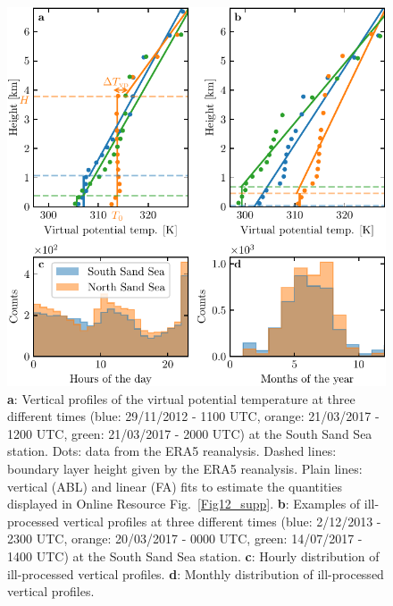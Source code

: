 \begin{figure}[p]
\centering
\includegraphics[scale=1]{Figures/Figure11_supp.pdf}
\caption{\textbf{a}: Vertical profiles of the virtual potential temperature at three different times (blue: 29/11/2012 - 1100 UTC, orange: 21/03/2017 - 1200 UTC, green: 21/03/2017 - 2000 UTC) at the South Sand Sea station. Dots: data from the ERA5 reanalysis. Dashed lines: boundary layer height given by the ERA5 reanalysis. Plain lines: vertical (ABL) and linear (FA) fits to estimate the quantities displayed in Online Resource Fig.~\ref{Fig12_supp}. \textbf{b}: Examples of ill-processed vertical profiles at three different times (blue: 2/12/2013 - 2300 UTC, orange: 20/03/2017 - 0000 UTC, green: 14/07/2017 - 1400 UTC) at the South Sand Sea station. \textbf{c}: Hourly distribution of ill-processed vertical profiles. \textbf{d}: Monthly distribution of ill-processed vertical profiles.}
\label{Fig11_supp}
\end{figure}

